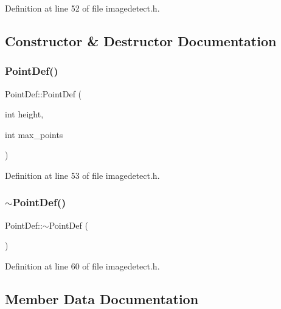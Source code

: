 Definition at line 52 of file imagedetect.\+h.



\subsection{Constructor \& Destructor Documentation}
\mbox{\label{struct_point_def_ade8be8c08d02c0f3e51c274b6b705d84}} 
\subsubsection{\texorpdfstring{PointDef()}{PointDef()}}
{\footnotesize\ttfamily Point\+Def\+::\+Point\+Def (\begin{DoxyParamCaption}\item[{int}]{height,  }\item[{int}]{max\+\_\+points }\end{DoxyParamCaption})\hspace{0.3cm}{\ttfamily [inline]}}



Definition at line 53 of file imagedetect.\+h.

\mbox{\label{struct_point_def_a31c4cea9c80b3b5da0f25ad0764b0e89}} 
\subsubsection{\texorpdfstring{$\sim$PointDef()}{~PointDef()}}
{\footnotesize\ttfamily Point\+Def\+::$\sim$\+Point\+Def (\begin{DoxyParamCaption}{ }\end{DoxyParamCaption})\hspace{0.3cm}{\ttfamily [inline]}}



Definition at line 60 of file imagedetect.\+h.



\subsection{Member Data Documentation}
\mbox{\label{struct_point_def_a667c90c1b37053ec95b6038f44fa48de}} 
